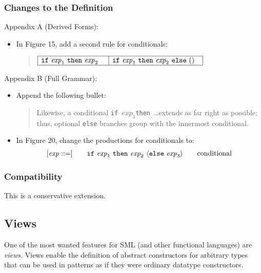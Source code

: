 \documentclass[twoside,titlepage]{article}
\begin{document}
\begin{appendix}
\subsubsection*{Changes to the Definition}

Appendix A (Derived Forms):
\begin{itemize}
\item In Figure 15, add a second rule for conditionals:
  \begin{quote}
  $\begin{array}{|l|l|}
  \hline
  {\tt{if}}~\mathit{exp}_1~{\tt{then}}~\mathit{exp}_2~~~
  &
  {\tt{if}}~\mathit{exp}_1~{\tt{then}}~\mathit{exp}_2~{\tt{else}}~()~~ \\
  \hline
  \end{array}$
  \end{quote}
\end{itemize}

Appendix B (Full Grammar):
\begin{itemize}
\item Append the following bullet:
  \begin{quote}
  Likewise, a conditional {\tt if}~$\mathit{exp}_1${\tt then}~\dots extends as far right as possible; thus, optional {\tt else} branches group with the innermost conditional.
  \end{quote}
  
\item In Figure 20, change the productions for conditionals to:
  $$
  \begin{array}{l@{\qquad}l@{\qquad}l}
  [\mathit{exp} ::=] & {\tt{if}}~\mathit{exp}_1~{\tt{then}}~\mathit{exp}_2~\langle{\tt{else}}~\mathit{exp}_3\rangle & \textrm{conditional}
  \end{array}
  $$
\end{itemize}

\subsubsection*{Compatibility}

This is a conservative extension.


\subsection{Views}
\label{ext-views}

One of the most wanted features for SML (and other functional languages) are \emph{views}. Views enable the definition of abstract constructors for arbitrary types that can be used in patterns as if they were ordinary datatype constructors.


\end{appendix}
\end{document}
